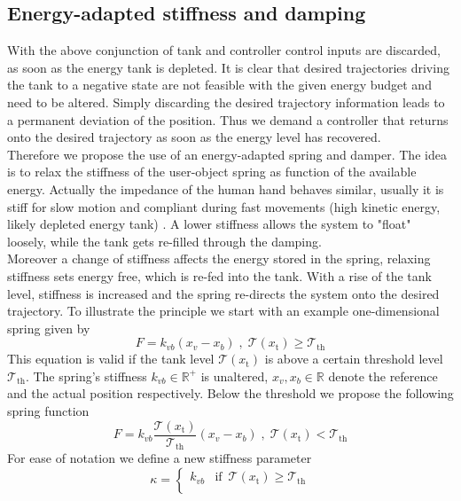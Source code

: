 \documentclass[a4paper,twoside, openright,12pt]{report}
\newcommand{\g}[1]{\text{#1}}
\begin{document}
{\subsection{Energy-adapted stiffness and damping}\label{SS:EnergyAdaptedStiffness}
With the above conjunction of tank and controller control inputs are discarded, as soon as the energy tank is depleted. It is clear that desired trajectories driving the tank to a negative state are not feasible with the given energy budget and need to be altered. Simply discarding the desired trajectory information leads to a permanent deviation of the position. Thus we demand a controller that returns onto the desired trajectory as soon as the energy level has recovered.\\ Therefore we propose the use of an energy-adapted spring and damper. The idea is to relax the stiffness of the user-object spring as function of the available energy. Actually the impedance of the human hand behaves similar, usually it is stiff for slow motion and compliant during fast movements (high kinetic energy, likely depleted energy tank) \cite{Hogan_84b}. A lower stiffness allows the system to "float" loosely, while the tank gets re-filled through the damping.\\ Moreover a change of stiffness affects the energy stored in the spring, relaxing stiffness sets energy free, which is re-fed into the tank. With a rise of the tank level, stiffness is increased and the spring re-directs the system onto the desired trajectory. To illustrate the principle we start with an example one-dimensional spring given by
\begin{equation}
F = k_{vb}(x_v-x_b) \;,\; \mathcal{T}(x_\g{t})\geq \mathcal{T}_{\g{th}}
\end{equation}
This equation is valid if the tank level $\mathcal{T}(x_\g{t})$ is above a certain threshold level $\mathcal{T}_{\g{th}}$. The spring's stiffness $k_{vb} \in \mathbb{R}^+$ is unaltered, $x_v, x_b \in \mathbb{R}$ denote the reference and the actual position respectively. Below the threshold we propose the following spring function
\begin{equation}
F = k_{vb}\frac{\mathcal{T}(x_\g{t})}{\mathcal{T}_{\g{th}}}(x_v-x_b) \;,\; \mathcal{T}(x_\g{t})<\mathcal{T}_{\g{th}}
\end{equation}
For ease of notation we define a new stiffness parameter
\begin{equation}
\kappa = \begin{cases}
k_{vb} & \text{if } \, \mathcal{T}(x_\g{t})\geq \mathcal{T}_{\g{th}} \\

\end{cases}
\end{equation}}
\end{document}
